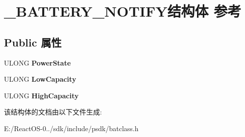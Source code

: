 \hypertarget{struct___b_a_t_t_e_r_y___n_o_t_i_f_y}{}\section{\+\_\+\+B\+A\+T\+T\+E\+R\+Y\+\_\+\+N\+O\+T\+I\+F\+Y结构体 参考}
\label{struct___b_a_t_t_e_r_y___n_o_t_i_f_y}
\subsection*{Public 属性}
\begin{DoxyCompactItemize}
\item 
\mbox{\label{struct___b_a_t_t_e_r_y___n_o_t_i_f_y_af9fd0f7191ef699cc3357a9d7909fbc4}} 
U\+L\+O\+NG {\bfseries Power\+State}
\item 
\mbox{\label{struct___b_a_t_t_e_r_y___n_o_t_i_f_y_a32afd63ceea95ab788a18aa0b26dd99f}} 
U\+L\+O\+NG {\bfseries Low\+Capacity}
\item 
\mbox{\label{struct___b_a_t_t_e_r_y___n_o_t_i_f_y_adc7222cfd40a5b4c76bccd13f28e6a2b}} 
U\+L\+O\+NG {\bfseries High\+Capacity}
\end{DoxyCompactItemize}


该结构体的文档由以下文件生成\+:\begin{DoxyCompactItemize}
\item 
E\+:/\+React\+O\+S-\/0../sdk/include/psdk/batclass.\+h\end{DoxyCompactItemize}
